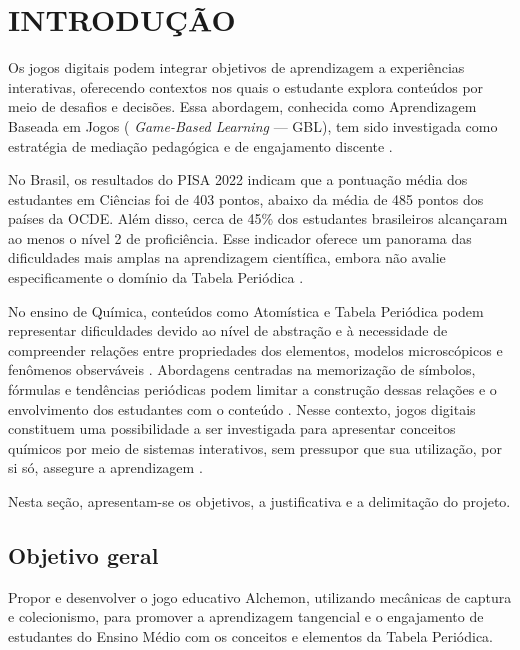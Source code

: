 \section{INTRODUÇÃO}
Os jogos digitais podem integrar objetivos de aprendizagem a experiências interativas, oferecendo contextos nos quais o estudante explora conteúdos por meio de desafios e decisões. Essa abordagem, conhecida como Aprendizagem Baseada em Jogos ( \textit{Game-Based Learning} — GBL), tem sido investigada como estratégia de mediação pedagógica e de engajamento discente \cite{Bellotti2010,Turkay2012,Plass2020}.

No Brasil, os resultados do PISA 2022 indicam que a pontuação média dos estudantes em Ciências foi de 403 pontos, abaixo da média de 485 pontos dos países da OCDE. Além disso, cerca de 45\% dos estudantes brasileiros alcançaram ao menos o nível 2 de proficiência. Esse indicador oferece um panorama das dificuldades mais amplas na aprendizagem científica, embora não avalie especificamente o domínio da Tabela Periódica \cite{OECD2023}.

No ensino de Química, conteúdos como Atomística e Tabela Periódica podem representar dificuldades devido ao nível de abstração e à necessidade de compreender relações entre propriedades dos elementos, modelos microscópicos e fenômenos observáveis \cite{Latonio2023,Lackey2022}. Abordagens centradas na memorização de símbolos, fórmulas e tendências periódicas podem limitar a construção dessas relações e o envolvimento dos estudantes com o conteúdo \cite{Lima2010}. Nesse contexto, jogos digitais constituem uma possibilidade a ser investigada para apresentar conceitos químicos por meio de sistemas interativos, sem pressupor que sua utilização, por si só, assegure a aprendizagem \cite{Han2021,Latonio2023}.

Nesta seção, apresentam-se os objetivos, a justificativa e a delimitação do projeto.

\subsection{Objetivo geral}
Propor e desenvolver o jogo educativo Alchemon, utilizando mecânicas de captura e colecionismo, para promover a aprendizagem tangencial e o engajamento de estudantes do Ensino Médio com os conceitos e elementos da Tabela Periódica.

